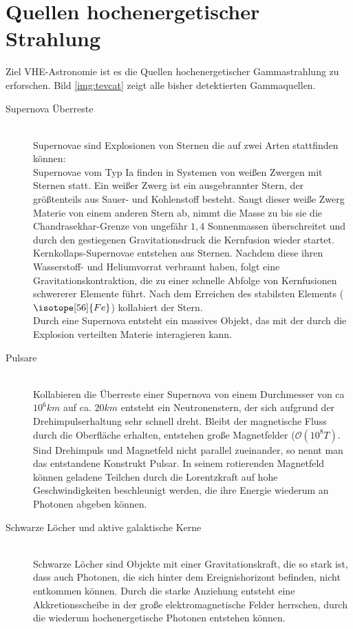 \section{Quellen hochenergetischer Strahlung}
Ziel VHE-Astronomie ist es die Quellen hochenergetischer Gammastrahlung zu erforschen. Bild \ref{img:tevcat} zeigt alle bisher detektierten Gammaquellen.
\begin{description}
\item[Supernova Überreste]\hfill \\
Supernovae sind Explosionen von Sternen die auf zwei Arten stattfinden können:\\Supernovae vom Typ Ia finden in Systemen von weißen Zwergen mit Sternen statt. Ein weißer Zwerg ist ein ausgebrannter Stern, der größtenteils aus Sauer- und Kohlenstoff besteht. Saugt dieser weiße Zwerg Materie von einem anderen Stern ab, nimmt die Masse zu bis sie die Chandrasekhar-Grenze von ungefähr $1,4$ Sonnenmassen \cite{Grupen} überschreitet und durch den gestiegenen Gravitationsdruck die Kernfusion wieder startet.\\Kernkollaps-Supernovae entstehen aus Sternen. Nachdem diese ihren Wasserstoff- und Heliumvorrat verbrannt haben, folgt eine Gravitationskontraktion, die zu einer schnelle Abfolge von Kernfusionen schwererer Elemente führt. Nach dem Erreichen des stabilsten Elements ($\isotope[56]{Fe}$) kollabiert der Stern.\\Durch eine Supernova entsteht ein massives Objekt, das mit der durch die Explosion verteilten Materie interagieren kann.
\item[Pulsare]\hfill \\
Kollabieren die Überreste einer Supernova von einem Durchmesser von ca $10^6\unit{km}$ auf ca. $20\unit{km}$ entsteht ein Neutronenstern, der sich aufgrund der Drehimpulserhaltung sehr schnell dreht. Bleibt der magnetische Fluss durch die Oberfläche erhalten, entstehen große Magnetfelder ($\mathcal{O}(10^8\unit{T})$\cite{Grupen}. Sind Drehimpuls und Magnetfeld nicht parallel zueinander, so nennt man das entstandene Konstrukt Pulsar. In seinem rotierenden Magnetfeld können geladene Teilchen durch die Lorentzkraft auf hohe Geschwindigkeiten beschleunigt werden, die ihre Energie wiederum an Photonen abgeben können.
\item[Schwarze Löcher und aktive galaktische Kerne]\hfill \\
Schwarze Löcher sind Objekte mit einer Gravitationskraft, die so stark ist, dass auch Photonen, die sich hinter dem Ereignishorizont befinden, nicht entkommen können. Durch die starke Anziehung entsteht eine Akkretionsscheibe in der große elektromagnetische Felder herrschen, durch die wiederum hochenergetische Photonen entstehen können.

\end{description}
